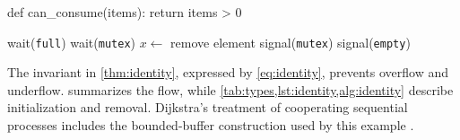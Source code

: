 \begin{unipdcode}[language=Python,caption={Checking buffer availability},label={lst:identity}]
def can_consume(items):
    return items > 0
\end{unipdcode}

\begin{algorithm}[htbp]
  \caption{Removing an element from the buffer}
  \label{alg:identity}
  wait(\texttt{full})\;
  wait(\texttt{mutex})\;
  $x\gets$ remove element\;
  signal(\texttt{mutex})\;
  signal(\texttt{empty})\;
  \;
\end{algorithm}

The invariant in \cref{thm:identity}, expressed by \cref{eq:identity}, prevents overflow and underflow.  summarizes the flow, while \cref{tab:types,lst:identity,alg:identity} describe initialization and removal. Dijkstra's treatment of cooperating sequential processes includes the bounded-buffer construction used by this example \autocite{dijkstra-ewd123}.

\printcoursebibliography

